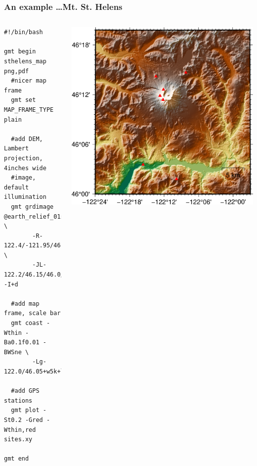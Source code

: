 \documentclass[unknownkeysallowed]{beamer}
\begin{document}
\begin{frame}[fragile=singleslide]
\frametitle{An example \dots Mt. St. Helens}
	\begin{columns}
		\tiny{
		\begin{verbatim}
#!/bin/bash

gmt begin sthelens_map png,pdf
  #nicer map frame
  gmt set MAP_FRAME_TYPE plain

  #add DEM, Lambert projection, 4inches wide 
  #image, default illumination
  gmt grdimage @earth_relief_01s \
        -R-122.4/-121.95/46.0/46.33 \
        -JL-122.2/46.15/46.0/46.3/4i -I+d

  #add map frame, scale bar
  gmt coast -Wthin -Ba0.1f0.01 -BWSne \
        -Lg-122.0/46.05+w5k+l+c46.1

  #add GPS stations
  gmt plot -St0.2 -Gred -Wthin,red sites.xy

gmt end		
		\end{verbatim}
}
		\begin{center}
				\includegraphics[width=\textwidth]{../figures/gmt_sthelens_map_04.png}	
		\end{center}
	\end{columns}
\end{frame}
\end{document}
